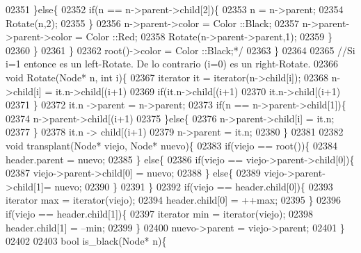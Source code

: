 \begin{DoxyCode}
02351 \textcolor{comment}{                \}else\{}
02352 \textcolor{comment}{                    if(n == n->parent->child[2])\{}
02353 \textcolor{comment}{                        n = n->parent;}
02354 \textcolor{comment}{                        Rotate(n,2);}
02355 \textcolor{comment}{                    \}}
02356 \textcolor{comment}{                    n->parent->color = Color ::Black;}
02357 \textcolor{comment}{                    n->parent->parent->color = Color ::Red;}
02358 \textcolor{comment}{                    Rotate(n->parent->parent,1);}
02359 \textcolor{comment}{                \}}
02360 \textcolor{comment}{            \}}
02361 \textcolor{comment}{        \}}
02362 \textcolor{comment}{        root()->color = Color ::Black;*/}
02363     \}
02364 
02365     \textcolor{comment}{//Si i=1 entonce es un left-Rotate. De lo contrario (i=0) es un right-Rotate.}
02366     \textcolor{keywordtype}{void} Rotate(Node* n, \textcolor{keywordtype}{int} i)\{
02367         iterator it = iterator(n->child[i]);
02368         n->child[i] = it.n->child[(i+1)%
02369         \textcolor{keywordflow}{if}(it.n->child[(i+1)%
02370             it.n->child[(i+1)%
02371         \}
02372         it.n ->parent = n->parent;
02373         \textcolor{keywordflow}{if}(n == n->parent->child[1])\{
02374             n->parent->child[(i+1)%
02375         \}\textcolor{keywordflow}{else}\{
02376             n->parent->child[i] = it.n;
02377         \}
02378         it.n -> child[(i+1)%
02379         n->parent = it.n;
02380     \}
02381 
02382     \textcolor{keywordtype}{void} transplant(Node* viejo, Node* nuevo)\{
02383         \textcolor{keywordflow}{if}(viejo == root())\{
02384             header.parent = nuevo;
02385         \} \textcolor{keywordflow}{else}\{
02386             \textcolor{keywordflow}{if}(viejo == viejo->parent->child[0])\{
02387                 viejo->parent->child[0] = nuevo;
02388             \} \textcolor{keywordflow}{else}\{
02389                 viejo->parent->child[1]= nuevo;
02390             \}
02391         \}
02392         \textcolor{keywordflow}{if}(viejo == header.child[0])\{
02393             iterator max = iterator(viejo);
02394             header.child[0] = ++max;
02395         \}
02396         \textcolor{keywordflow}{if}(viejo == header.child[1])\{
02397             iterator min = iterator(viejo);
02398             header.child[1] = --min;
02399         \}
02400         nuevo->parent = viejo->parent;
02401     \}
02402 
02403     \textcolor{keywordtype}{bool} is\_black(Node* n)\{

\end{DoxyCode}
